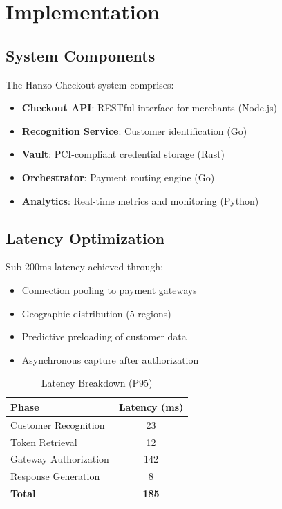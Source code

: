 \section{Implementation}


\subsection{System Components}

The Hanzo Checkout system comprises:

\begin{itemize}
    \item \textbf{Checkout API}: RESTful interface for merchants (Node.js)
    \item \textbf{Recognition Service}: Customer identification (Go)
    \item \textbf{Vault}: PCI-compliant credential storage (Rust)
    \item \textbf{Orchestrator}: Payment routing engine (Go)
    \item \textbf{Analytics}: Real-time metrics and monitoring (Python)
\end{itemize}

\subsection{Latency Optimization}

Sub-200ms latency achieved through:

\begin{itemize}
    \item Connection pooling to payment gateways
    \item Geographic distribution (5 regions)
    \item Predictive preloading of customer data
    \item Asynchronous capture after authorization
\end{itemize}

\begin{table}[h]
\centering
\caption{Latency Breakdown (P95)}
\begin{tabular}{lc}
\toprule
\textbf{Phase} & \textbf{Latency (ms)} \\
\midrule
Customer Recognition & 23 \\
Token Retrieval & 12 \\
Gateway Authorization & 142 \\
Response Generation & 8 \\
\midrule
\textbf{Total} & \textbf{185} \\
\bottomrule
\end{tabular}
\end{table}

